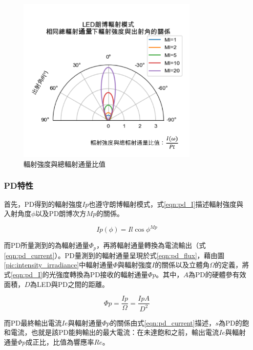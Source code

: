         \begin{figure}[h]
            \centering
            \includegraphics[width=9cm]{ch2pic/lambertian_led.png}
            \caption{輻射強度與總輻射通量比值}
            \label{pic:lambertian_led}
        \end{figure}



        \subsubsection{PD特性}
        \label{chp:PD}

        首先，PD得到的輻射強度$Ip$也遵守朗博輻射模式，式\ref{eqn:pd_I}描述輻射強度與入射角度$\phi$以及PD朗博次方$Mp$的關係。

        \begin{equation}
            \label{eqn:pd_I}
            Ip(\phi) = Il \cos \phi^{Mp}
        \end{equation}

        而PD所量測到的為輻射通量$\Phi_p$，再將輻射通量轉換為電流輸出（式\ref{eqn:pd_current}）。PD量測到的輻射通量呈現於式\ref{eqn:pd_flux}，藉由圖\ref{pic:intensity_irradiance}中輻射通量$\Phi$與輻射強度$I$的關係以及立體角$\Omega$的定義，將式\ref{eqn:pd_I}的光強度轉換為PD接收的輻射通量$\Phi p$。其中，$A$為PD的硬體參有效面積，$D$為LED與PD之間的距離。

        \begin{equation}
            \label{eqn:pd_flux}
            \Phi p = \frac{Ip}{\Omega} = \frac{IpA}{D^2}
        \end{equation}

        而PD最終輸出電流$Ie$與輻射通量$\Phi p$的關係由式\ref{eqn:pd_current}描述，$s$為PD的飽和電流，也就是該PD能夠輸出的最大電流：在未達飽和之前，輸出電流$Ie$與輻射通量$\Phi p$成正比，比值為響應率$Re$。

